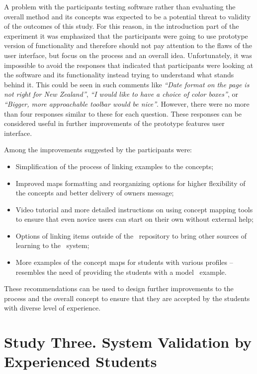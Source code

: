 A problem with the participants testing software rather than evaluating the
overall method and its concepts was expected to be a potential threat to
validity of the outcomes of this study. For this reason, in the introduction
part of the experiment it was emphasized that the participants were going to use
prototype version of functionality and therefore should not pay attention to
the flaws of the user interface, but focus on the process and an overall idea.
Unfortunately, it was impossible to avoid the responses that indicated that
participants were looking at the software and its functionality instead trying
to understand what stands behind it. This could be seen in such comments like
\textit{``Date format on the page is not right for New Zealand''}, \textit{``I
would like to have a choice of color boxes''}, or \textit{``Bigger, more
approachable toolbar would be nice''}. However, there were no more than four
responses similar to these for each question. These responses can be considered
useful in further improvements of the prototype features user interface.

Among the improvements suggested by the participants were:

\begin{itemize}
  \item Simplification of the process of linking examples to the concepts;
  \item Improved maps formatting and reorganizing options for higher
  flexibility of the concepts and better delivery of owners message;
  \item Video tutorial and more detailed instructions on using concept mapping
  tools to ensure that even novice users can start on their own without external
  help;
  \item Options of linking items outside of the \ep~repository to bring other
  sources of learning to the \ep~system;
  \item More examples of the concept maps for students with various profiles --
  resembles the need of providing the students with a model \ep~example.
\end{itemize}

These recommendations can be used to design further improvements to the process
and the overall concept to ensure that they are accepted by the students with
diverse level of experience.
 
\section{Study Three. System Validation by Experienced Students}
\label{sec:three}

